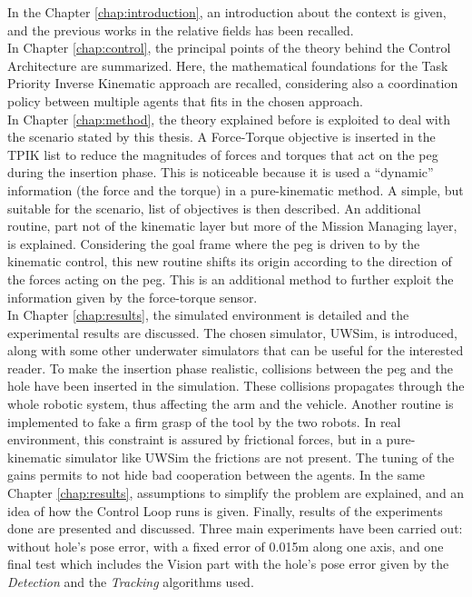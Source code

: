 In the Chapter \ref{chap:introduction}, an introduction about the context is given, and the previous works in the relative fields has been recalled.\\
In Chapter \ref{chap:control}, the principal points of the theory behind the Control Architecture are summarized. Here, the mathematical foundations for the Task Priority Inverse Kinematic approach are recalled, considering also a coordination policy between multiple agents that fits in the chosen approach.\\
In Chapter \ref{chap:method}, the theory explained before is exploited to deal with the scenario stated by this thesis. A Force-Torque objective is inserted in the TPIK list to reduce the magnitudes of forces and torques that act on the peg during the insertion phase. This is noticeable because it is used a \enquote{dynamic} information (the force and the torque) in a pure-kinematic method. A simple, but suitable for the scenario, list of objectives is then described. An additional routine, part not of the kinematic layer but more of the Mission Managing layer, is explained. Considering the goal frame where the peg is driven to by the kinematic control, this new routine shifts its origin according to the direction of the forces acting on the peg. This is an additional method to further exploit the information given by the force-torque sensor.\\
In Chapter \ref{chap:results}, the simulated environment is detailed and the experimental results are discussed. The chosen simulator, UWSim, is introduced, along with some other underwater simulators that can be useful for the interested reader. To make the insertion phase realistic, collisions between the peg and the hole have been inserted in the simulation. These collisions propagates through the whole robotic system, thus affecting the arm and the vehicle. Another routine is implemented to fake a firm grasp of the tool by the two robots. In real environment, this constraint is assured by frictional forces, but in a pure-kinematic simulator like UWSim the frictions are not present. The tuning of the gains permits to not hide bad cooperation between the agents.  In the same Chapter \ref{chap:results}, assumptions to simplify the problem are explained, and an idea of how the Control Loop runs is given. Finally, results of the experiments done are presented and discussed. Three main experiments have been carried out: without hole's pose error, with a fixed error of 0.015m along one axis, and one final test which includes the Vision part with the hole's pose error given by the \textit{Detection} and the \textit{Tracking} algorithms used.\\
